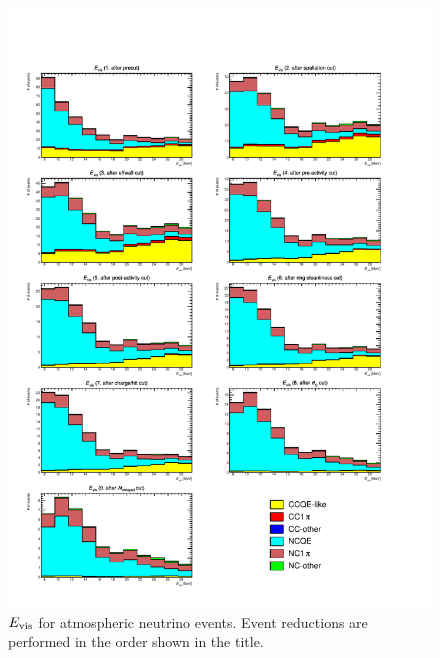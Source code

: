 \begin{figure}[h]
	\centering
	\includegraphics[width=15cm]{PDF/Dist_ATM/Che_50deg_tag_ge1/All/erec}
	\caption[$E_{\rm vis}$ for atmospheric neutrino events]{
	$E_{\rm vis}$ for atmospheric neutrino events.
	Event reductions are performed in the order shown in the title.
	}\label{ATM_erec}
\end{figure}

